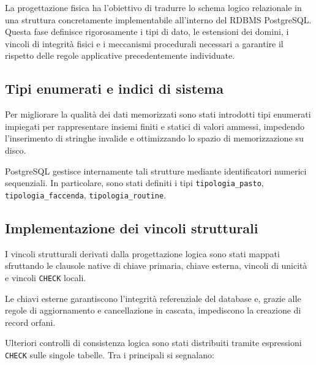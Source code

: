 \documentclass[11pt,a4paper]{article}
\begin{document}
La progettazione fisica ha l'obiettivo di tradurre lo schema logico relazionale in una
struttura concretamente implementabile all'interno del RDBMS PostgreSQL. Questa fase definisce
rigorosamente i tipi di dato, le estensioni dei domini, i vincoli di integrità fisici e i
meccanismi procedurali necessari a garantire il rispetto delle regole applicative
precedentemente individuate.

\subsection{Tipi enumerati e indici di sistema}

Per migliorare la qualità dei dati memorizzati sono stati introdotti tipi enumerati impiegati
per rappresentare insiemi finiti e statici di valori ammessi, impedendo l'inserimento di
stringhe invalide e ottimizzando lo spazio di memorizzazione su disco.

PostgreSQL gestisce internamente tali strutture mediante identificatori numerici sequenziali.
In particolare, sono stati definiti i tipi \texttt{tipologia\_pasto}, \texttt{tipologia\_faccenda},
\texttt{tipologia\_routine}.

\subsection{Implementazione dei vincoli strutturali}

I vincoli strutturali derivati dalla progettazione logica sono stati mappati sfruttando le
clausole native di chiave primaria, chiave esterna, vincoli di unicità e vincoli \texttt{CHECK}
locali.

Le chiavi esterne garantiscono l'integrità referenziale del database e, grazie alle regole di
aggiornamento e cancellazione in cascata, impediscono la creazione di record orfani.

Ulteriori controlli di consistenza logica sono stati distribuiti tramite espressioni
\texttt{CHECK} sulle singole tabelle. Tra i principali si segnalano:
\end{document}
